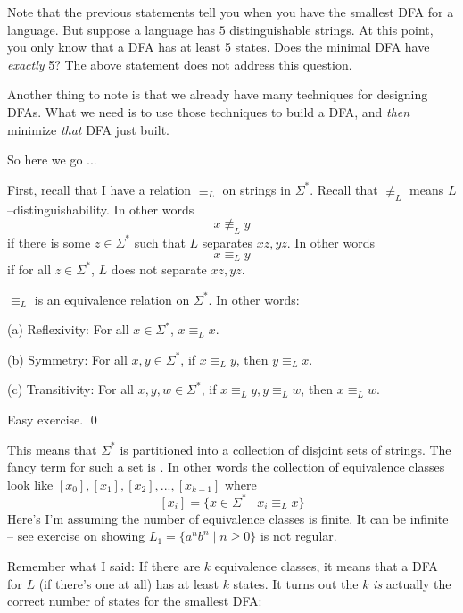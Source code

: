 \newpage
Note that the previous statements tell you when you have the smallest DFA for a language.
But suppose a language has $5$ distinguishable strings.
At this point, you only know that a DFA has at least 5 states.
Does the minimal DFA have \textit{exactly} 5?
The above statement does not address this question.

Another thing to note is that we already have many techniques for
designing DFAs.
What we need is to use those techniques to build a DFA, and \textit{then} minimize \textit{that} DFA just built.

So here we go ...

First, recall that I have a relation $\equiv_L$ on strings in $\Sigma^*$.
Recall that $\not\equiv_L$ means $L$--distinguishability.
In other words
\[
x \not\equiv_L y
\]
if there is some $z \in\Sigma^*$ such that $L$ separates $xz,yz$.
In other words
\[
x \equiv_L y
\]
if for all $z \in\Sigma^*$, $L$ does not separate $xz,yz$.

\begin{prop}
  $\equiv_L$ is an equivalence relation on $\Sigma^*$.
  In other words:
  \begin{tightlist}
    \item[\textnormal{(a)}] Reflexivity: For all $x \in \Sigma^*$, $x \equiv_L x$. 
    \item[\textnormal{(b)}] Symmetry: For all $x,y \in \Sigma^*$, if $x \equiv_L y$, then $y \equiv_L x$. 
    \item[\textnormal{(c)}] Transitivity: For all $x,y,w \in \Sigma^*$, if $x \equiv_L y, y \equiv_L w$, then $x \equiv_L w$. 
  \end{tightlist}
\end{prop}
\proof
Easy exercise.
\qed

This means that $\Sigma^*$ is partitioned into a collection of disjoint sets of strings.
The fancy term for such a set is .
In other words the collection of equivalence classes look like
$
[x_0],
[x_1],
[x_2],...,
[x_{k-1}]
$
where
\[
[x_i] = \{x \in \Sigma^* \mid x_i \equiv_L x \}
\]
Here's I'm assuming the number of equivalence classes is finite.
It can be infinite -- see exercise on showing $L_1 = \{a^n b^n \mid n \geq 0\}$ is not regular.

Remember what I said: If there are $k$ equivalence classes,
it means that a DFA for $L$ (if there's one at all) has at least $k$ states.
It turns out the $k$ \textit{is} actually the correct number of states for the smallest DFA:

